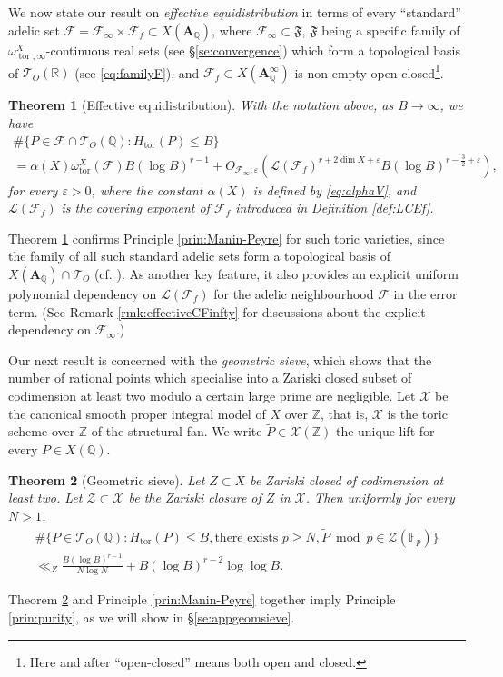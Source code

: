 \documentclass[11pt,letterpaper]{amsart}
\newcommand{\BF}{{\mathbb {F}}}
\newcommand{\BQ}{{\mathbb {Q}}}
\newcommand{\BR}{{\mathbb {R}}}
\newcommand{\BZ}{{\mathbb {Z}}}
\newcommand{\CF}{{\mathcal {F}}}
\newcommand{\CL}{{\mathcal {L}}}
\newcommand{\CT}{{\mathcal {T}}}
\newcommand{\CX}{{\mathcal {X}}}
\newcommand{\CZ}{{\mathcal {Z}}}
\newcommand{\RA}{{\mathbf {A}}}
\theoremstyle{plain}
\numberwithin{equation}{section}
\newtheorem{theorem}{Theorem}[section]
\theoremstyle{definition}
\theoremstyle{remark}
\begin{document}
We now state our result on  \emph{effective equidistribution}  in terms of every ``standard'' adelic set $\CF=\CF_\infty\times\CF_{f}\subset X(\RA_\BQ)$, where $\CF_\infty\subset \mathfrak{F}$, $\mathfrak{F}$ being a specific family of $\omega_{\operatorname{tor},\infty}^X$-continuous real sets (see \S\ref{se:convergence}) which form a topological basis of $\CT_{O}(\BR)$ (see \eqref{eq:familyF}), and $\CF_{f}\subset X(\RA_\BQ^\infty)$ is non-empty open-closed\footnote{Here and after ``open-closed'' means both open and closed.}.

\begin{theorem}[Effective equidistribution]\label{thm:mainequidist}
	With the notation above, as $B\to\infty$, we have 
	\begin{multline*}
		\#\{P\in \CF\cap \CT_{O}(\BQ):H_{\operatorname{tor}}(P)\leqslant B\}\\=\alpha(X)\omega_{\operatorname{tor}}^X (\CF)B(\log B)^{r-1}+O_{\CF_\infty,\varepsilon}\left(\CL(\CF_f)^{r+2\dim X+\varepsilon}B(\log B)^{r-\frac{3}{2}+\varepsilon}\right), 
	\end{multline*}
	 for every $\varepsilon>0$, where the constant $\alpha(X)$ is defined by \eqref{eq:alphaV}, and $\CL(\CF_f)$ is the covering exponent of $\CF_{f}$ introduced in Definition \ref{def:LCEf}.
\end{theorem}
Theorem \ref{thm:mainequidist} confirms Principle \ref{prin:Manin-Peyre} for such toric varieties, since the family of all such standard adelic sets form a topological basis of $X(\RA_\BQ)\cap \CT_{O}$ (cf. \cite[Proposition 3.3]{Peyre}). As another key feature, it also provides an explicit uniform polynomial dependency on $\CL(\CF_{f})$ for the adelic neighbourhood $\CF$ in the error term.  
(See Remark \ref{rmk:effectiveCFinfty} for discussions about the explicit dependency on $\CF_\infty$.)

Our next result is concerned with the \emph{geometric sieve}, which shows that the number of rational points which specialise into a Zariski closed subset of codimension at least two modulo a certain large prime are negligible. Let $\CX$ be the canonical smooth proper integral model  of $X$ over $\BZ$, that is, $\CX$ is the toric scheme over $\BZ$ of the structural fan. We write $\widetilde{P}\in\CX(\BZ)$ the unique lift for every $P\in X(\BQ)$.
\begin{theorem}[Geometric sieve]\label{thm:maingeomsieve}
	Let $Z\subset X$ be Zariski closed of codimension at least two.
	Let $\CZ\subset \CX$ be the Zariski closure of $Z$ in $\CX$. Then uniformly for every $N>1$,
	\begin{multline*}
		\#\{P\in \CT_{O}(\BQ):H_{\operatorname{tor}}(P)\leqslant B, \text{there exists } p\geqslant N,\widetilde{P}~\operatorname{mod}~ p \in\CZ(\BF_p)\}\\\ll_Z \frac{B(\log B)^{r-1}}{N\log N}+B(\log B)^{r-2}\log\log B.
	\end{multline*}
\end{theorem}
Theorem \ref{thm:maingeomsieve} and Principle \ref{prin:Manin-Peyre} together imply Principle \ref{prin:purity}, as we will show in \S\ref{se:appgeomsieve}. 
\end{document}
